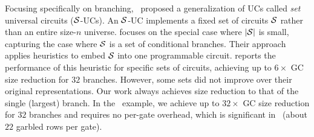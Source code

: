 Focusing specifically on branching,~\cite{AC:KenKolWil17} proposed a
generalization of UCs called \emph{set} universal circuits ($\cal
S$-UCs).  An $\cal S$-UC implements a fixed set of circuits $\cal S$
rather than an entire size-$n$ universe.  \cite{AC:KenKolWil17}
focuses on the special case where $|\cal S|$ is small, capturing the
case where $\cal S$ is a set of conditional branches.  Their approach
applies heuristics to embed $\cal S$ into one programmable circuit.
\cite{AC:KenKolWil17} reports the performance of this heuristic for
specific sets of circuits, achieving up to $6\times$ GC size reduction
for $32$ branches.  However, some sets did not improve over their
original representations.  Our work always achieves size reduction to
that of the single (largest) branch. In the~\cite{AC:KenKolWil17}
example, we achieve up to $32\times$ GC size reduction for $32$
branches and requires no per-gate overhead, which is significant
in~\cite{AC:KenKolWil17} (about $22$ garbled rows per gate).  

